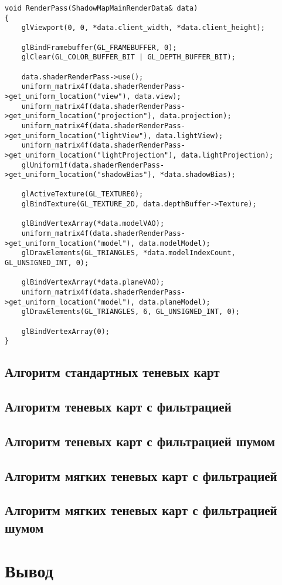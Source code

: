 \begin{center}
\captionsetup{justification=centering, singlelinecheck=off}
\begin{lstlisting}[label=lst:shadow_map_render, caption=Алгоритм заполнения теневой карты]
void RenderPass(ShadowMapMainRenderData& data)
{
    glViewport(0, 0, *data.client_width, *data.client_height);

    glBindFramebuffer(GL_FRAMEBUFFER, 0);
    glClear(GL_COLOR_BUFFER_BIT | GL_DEPTH_BUFFER_BIT);

    data.shaderRenderPass->use();
    uniform_matrix4f(data.shaderRenderPass->get_uniform_location("view"), data.view);
    uniform_matrix4f(data.shaderRenderPass->get_uniform_location("projection"), data.projection);
    uniform_matrix4f(data.shaderRenderPass->get_uniform_location("lightView"), data.lightView);
    uniform_matrix4f(data.shaderRenderPass->get_uniform_location("lightProjection"), data.lightProjection);
    glUniform1f(data.shaderRenderPass->get_uniform_location("shadowBias"), *data.shadowBias);

    glActiveTexture(GL_TEXTURE0);
    glBindTexture(GL_TEXTURE_2D, data.depthBuffer->Texture);

    glBindVertexArray(*data.modelVAO);
    uniform_matrix4f(data.shaderRenderPass->get_uniform_location("model"), data.modelModel);
    glDrawElements(GL_TRIANGLES, *data.modelIndexCount, GL_UNSIGNED_INT, 0);

    glBindVertexArray(*data.planeVAO);
    uniform_matrix4f(data.shaderRenderPass->get_uniform_location("model"), data.planeModel);
    glDrawElements(GL_TRIANGLES, 6, GL_UNSIGNED_INT, 0);

    glBindVertexArray(0);
}
\end{lstlisting}
\end{center}

\subsection{Алгоритм стандартных теневых карт}

\subsection{Алгоритм теневых карт с фильтрацией}

\subsection{Алгоритм теневых карт с фильтрацией шумом}

\subsection{Алгоритм мягких теневых карт с фильтрацией}

\subsection{Алгоритм мягких теневых карт с фильтрацией шумом}

\section*{Вывод}